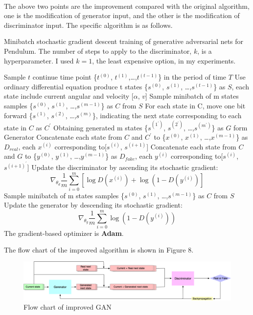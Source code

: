 \documentclass[11pt,a4paper]{article}
\begin{document}
\\
\newline
The above two points are the improvement compared with the original algorithm, one is the modification of generator input, and the other is the modification of discriminator input. The specific algorithm is as follows.
\\
\newline
\begin{algorithm}[ht!]
\caption{Minibatch stochastic gradient descent training of generative adversarial nets for Pendulum. The number of steps to apply to the discriminator, $k$, is a hyperparameter.  I used $k = 1$, the least expensive option, in my experiments.}
\label{algorithm}
\begin{algorithmic}[1]
\STATE Sample $t$ continue time point \{$t^{(0)}$, $t^{(1)}$,…,$t^{(t-1)}$\} in the period of time $T$
\STATE Use ordinary differential equation produce t states \{$s^{(0)}$, $s^{(1)}$, …,$s^{(t-1)}$\} as $S$, each state include current angular and velocity [$\alpha$, $v$]
\STATE Sample minibatch of m states samples \{$s^{(0)}$, $s^{(1)}$, …,$s^{(m-1)}$\} as $C$ from $S$
\STATE For each state in C, move one bit forward \{$s^{(1)}$, $s^{(2)}$, …,$s^{(m)}$\}, indicating the next state corresponding to each state in $C$ as $C^{\prime}$
\STATE Obtaining generated m states \{$s^{(1^{\prime})}$, $s^{(2^{\prime})}$, …,$s^{(m^{\prime})}$\} as $G$ form Generator
\STATE Concatenate each state from $C$ and $C^{\prime}$ to \{$x^{(0)}$, $x^{(1)}$, …,$x^{(m-1)}$\} as $D_{real}$, each $x^{(i)}$ corresponding to[$s^{(i)}$, $s^{(i+1)}$]
\STATE Concatenate each state from $C$ and $G$ to \{$y^{(0)}$, $y^{(1)}$, …,$y^{(m-1)}$\} as $D_{fake}$, each $y^{(i)}$ corresponding to[$s^{(i)}$, $s^{(i+1)^{\prime}}$]
\STATE Update the discriminator by ascending its stochastic gradient:
$$
\nabla_{\theta_{d}} \frac{1}{m} \sum_{i=0}^{m}\left[\log D\left(x^{(i)}\right)+\log \left(1-D\left(y^{(i)}\right)\right]\right.
$$
\ENDFOR
\STATE Sample minibatch of m states samples \{$s^{(0)}$, $s^{(1)}$, …,$s^{(m-1)}$\} as $C$ from $S$
\STATE Update the generator by descending its stochastic gradient:
$$
\nabla_{\theta_{g}} \frac{1}{m} \sum_{i=0}^{m} \log \left(1-D\left(y^{(i)}\right)\right)
$$
\ENDFOR
\STATE The gradient-based optimizer is \textbf{Adam}.
\end{algorithmic}
\end{algorithm}
The flow chart of the improved algorithm is shown in Figure 8.
\begin{figure}[ht!]
\centering
\includegraphics[scale=0.32]{8.png}
\caption{Flow chart of improved GAN}
\label{fig:Flow chart of improved GAN}
\end{figure}
\newpage
\end{document}
